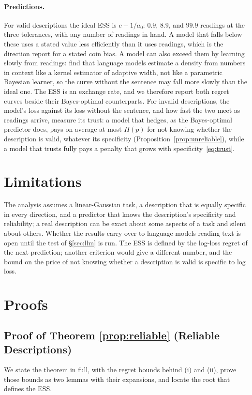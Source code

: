 \documentclass[10pt]{article}
\begin{document}
\paragraph{Predictions.} For valid descriptions the ideal ESS is $c - 1/a_0$: $0.9$, $8.9$, and $99.9$ readings at the three tolerances, with any number of readings in hand. A model that falls below these uses a stated value less efficiently than it uses readings, which is the direction \citet{gupta2025} report for a stated coin bias. A model can also exceed them by learning slowly from readings: \citet{liu2025} find that language models estimate a density from numbers in context like a kernel estimator of adaptive width, not like a parametric Bayesian learner, so the curve without the sentence may fall more slowly than the ideal one. The ESS is an exchange rate, and we therefore report both regret curves beside their Bayes-optimal counterparts. For invalid descriptions, the model's loss against its loss without the sentence, and how fast the two meet as readings arrive, measure its trust: a model that hedges, as the Bayes-optimal predictor does, pays on average at most $H(p)$ for not knowing whether the description is valid, whatever its specificity (Proposition~\ref{prop:unreliable}), while a model that trusts fully pays a penalty that grows with specificity~\eqref{eq:trust}.

\section{Limitations}
The analysis assumes a linear-Gaussian task, a description that is equally specific in every direction, and a predictor that knows the description's specificity and reliability; a real description can be exact about some aspects of a task and silent about others. Whether the results carry over to language models reading text is open until the test of \S\ref{sec:llm} is run. The ESS is defined by the log-loss regret of the next prediction; another criterion would give a different number, and the bound on the price of not knowing whether a description is valid is specific to log loss.




\clearpage
\appendix
\section{Proofs}

\subsection{Proof of Theorem \ref{prop:reliable} (Reliable Descriptions)}\label{app:specificity}
We state the theorem in full, with the regret bounds behind (i) and (ii), prove those bounds as two lemmas with their expansions, and locate the root that defines the ESS.
\end{document}
